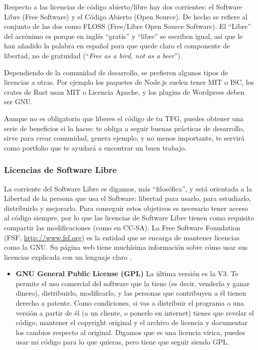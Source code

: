 \begin{naranja}
Respecto a las licencias de código abierto/libre hay dos corrientes: el Software Libre (Free Software) y el Código Abierto (Open Source). De hecho se refiere al conjunto de las dos como FLOSS (Free/Libre Open Source Software). El ``Libre'' del acrónimo es porque en inglés ``gratis'' y ``libre'' se escriben igual, así que le han añadido la palabra en español para que quede claro el componente de libertad, no de gratuidad (``\textit{Free as a bird, not as a beer}'').

Dependiendo de la comunidad de desarrollo, se prefieren algunos tipos de licencias a otras. Por ejemplo los paquetes de Node.js suelen tener MIT o ISC, los crates de Rust usan MIT o Licencia Apache, y los plugins de Wordpress deben ser GNU.

Aunque no es obligatorio que liberes el código de tu TFG, puedes obtener una serie de beneficios si lo haces: te obliga a seguir buenas prácticas de desarrollo, sirve para crear comunidad, genera ejemplo, y no menos importante, te servirá como portfolio que te ayudará a encontrar un buen trabajo.

\subsubsection{Licencias de Software Libre}
La corriente del Software Libre es digamos, más ``filosófica'', y está orientada a la Libertad de la persona que usa el Software: libertad para usarlo, para estudiarlo, distribuirlo y mejorarlo. Para conseguir estos objetivos es necesario tener acceso al código siempre, por lo que las licencias de Software Libre tienen como requisito compartir las modificaciones (como en CC-SA). La Free Software Foundation (FSF, \url{http://www.fsf.org}) es la entidad que se encarga de mantener licencias como la GNU. Su página web tiene muchísima información sobre cómo usar sus licencias explicada con un lenguaje claro \cite{FSFfaq}.

\begin{itemize}

\item \textbf{GNU General Public License (GPL)} La última versión es la V3. Te permite el uso comercial del software que la tiene (es decir, venderlo y ganar dinero), distribuirlo, modificarlo, y las personas que contribuyen a él tienen derecho a patente. Como condiciones, si vas a distribuir el programa o una versión a partir de él (a un cliente, o ponerlo en internet) tienes que revelar el código, mantener el copyright original y el archivo de licencia y documentar los cambios respecto al original. Digamos que es una licencia vírica, puedes usar mi código para lo que quieras, pero tiene que seguir siendo GPL.


\end{itemize}
\end{naranja}
